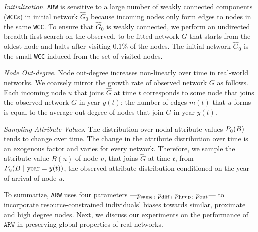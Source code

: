 \textit{Initialization}. \texttt{ARW} is
sensitive to a large number of weakly connected components (\texttt{WCC}s) in
initial network $\hat{G}_0$ because incoming nodes only form edges to nodes
in the same \texttt{WCC}. To ensure that $\hat{G}_0$ is weakly
connected, we perform an undirected breadth-first search on the observed,
to-be-fitted network $G$ that starts from the oldest node and halts after
visiting $0.1\%$ of the nodes. The initial network $\hat{G}_0$ is the small \texttt{WCC}
induced from the set of visited nodes.


\textit{Node Out-degree}.
Node out-degree increases non-linearly over time in real-world networks.
We coarsely mirror the growth rate of observed network $G$ as follows.
Each incoming node $u$ that joins $\hat{G}$ at time $t$ corresponds to some
node that joins the observed network $G$ in year $y(t)$; the number of edges $m(t)$
that $u$ forms is equal to the average out-degree of nodes that join $G$ in year $y(t)$.

\textit{Sampling Attribute Values}.
The distribution over nodal attribute values $P_{\textsc{g}}(B)$ tends to change over time.
The change in the attribute distribution over time is an exogenous factor and varies for every network.
Therefore, we sample the attribute value $B(u)$ of node $u$, that joins $\hat{G}$ at time
$t$, from $P_{\textsc{g}}(B{\mbox{ | year}=y(t)})$, the observed attribute
distribution conditioned on the year of arrival of node $u$.

To summarize,
\texttt{ARW} uses four parameters ---$p_{\scriptsize\mbox{same}}$, $p_{\scriptsize\mbox{diff}}$, $p_{\scriptsize\mbox{jump}}$, $p_{\scriptsize\mbox{out}}$--- to incorporate
resource-constrained individuals' biases towards similar, proximate and high degree nodes.
Next, we discuss our experiments on the performance of $\texttt{ARW}$
in preserving global properties of real networks.
